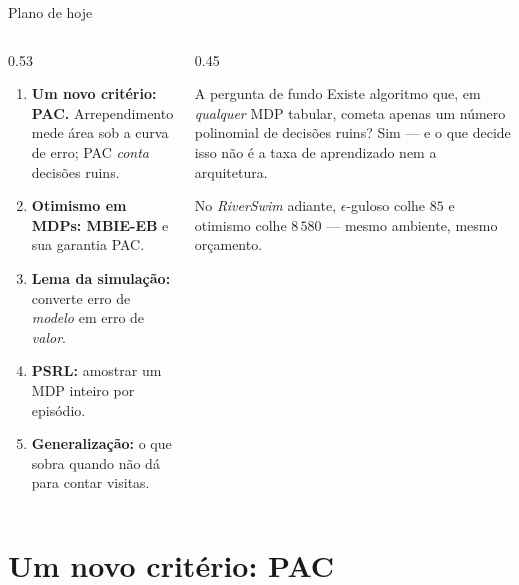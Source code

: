 \documentclass[aspectratio=169, 11pt]{beamer}
\begin{document}
\begin{frame}{Plano de hoje}
  \begin{columns}[T]
    \begin{column}{0.53\textwidth}
      \begin{enumerate}
        \item \textbf{Um novo critério: PAC.} Arrependimento mede área sob a curva de
              erro; PAC \emph{conta} decisões ruins.
        \item \textbf{Otimismo em MDPs: MBIE-EB} e sua garantia PAC.
        \item \textbf{Lema da simulação:} converte erro de \emph{modelo} em erro de
              \emph{valor}.
        \item \textbf{PSRL:} amostrar um MDP inteiro por episódio.
        \item \textbf{Generalização:} o que sobra quando não dá para contar visitas.
      \end{enumerate}
    \end{column}
    \begin{column}{0.45\textwidth}
      \begin{teobox}{A pergunta de fundo}
        Existe algoritmo que, em \emph{qualquer} MDP tabular, cometa apenas um número
        \alert{polinomial} de decisões ruins? Sim --- e o que decide isso não é a taxa
        de aprendizado nem a arquitetura.
      \end{teobox}
      \begin{ideiabox}
        No \textit{RiverSwim} adiante, $\epsilon$-guloso colhe $85$ e otimismo colhe
        $8\,580$ --- mesmo ambiente, mesmo orçamento.
      \end{ideiabox}
    \end{column}
  \end{columns}
\end{frame}

\section{Um novo critério: PAC}
\end{document}
